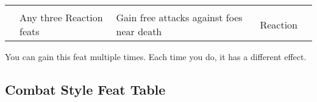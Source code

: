 \begin{longtabuwrapper}
\begin{longtabu}{>{\lcol}p{10em} >{\lcol}p{15em} >{\lcol}X >{\lcol}p{6em} >{\lcol}p{3em}}
        \midrule
         &  &  &  &  \\
         & Any three Reaction feats & Gain free attacks against foes near death & Reaction &  \\
    \end{longtabu}
    \begin{enumerate*}
        \item You can gain this feat multiple times.
            Each time you do, it has a different effect.
    \end{enumerate*}
\end{longtabuwrapper}

\subsection{Combat Style Feat Table}

